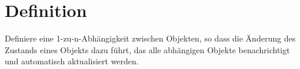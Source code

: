 \section{Definition}
\glqq Definiere eine 1-zu-n-Abhängigkeit zwischen Objekten, so dass die Änderung des Zustands eines Objekts dazu führt, das alle abhängigen Objekte benachrichtigt und automatisch aktualisiert werden. \grqq 